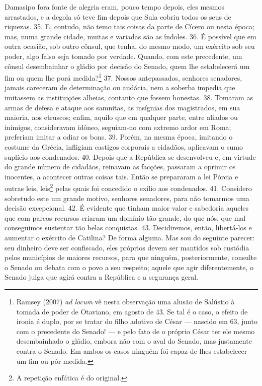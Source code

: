 Damasipo fora fonte de alegria eram, pouco tempo depois, eles mesmos
arrastados, e a degola só teve fim depois que Sula cobriu todos os seus de
riquezas. 35. E, contudo, não temo tais coisas da parte de  Cícero ou nesta
época; mas, numa grande cidade, muitas e variadas são as índoles. 36. É
possível que em outra ocasião, sob outro cônsul, que tenha, do mesmo modo, um
exército sob seu poder, algo falso seja tomado por verdade. Quando, com
este precedente, um cônsul desembainhar o gládio por decisão do Senado, quem
lhe estabelecerá um fim ou quem lhe porá medida?\footnote{Ramsey (2007)
\emph{ad locum} vê nesta observação uma alusão de Salústio à tomada de poder de
Otaviano, em agosto de 43. Se tal é o caso, o efeito de ironia é duplo, por se
tratar do filho adotivo de César --- nascido em 63, junto com o precedente do
Senado! --- e pelo fato de o próprio César ter ele mesmo desembainhado o
gládio, embora não com o aval do Senado, mas justamente contra o Senado. Em
ambos os casos ninguém foi capaz de lhes estabelecer um fim ou pôr medida.} 37.
Nossos antepassados, senhores senadores, jamais careceram de determinação ou
audácia, nem a soberba impedia que imitassem as instituições alheias, contanto
que fossem honestas. 38. Tomaram as armas de defesa e ataque aos samnitas, as
insígnias dos magistrados, em sua maioria, aos etruscos; enfim, aquilo que em
qualquer parte, entre aliados ou inimigos, consideravam idôneo, seguiam-no com
extremo ardor em Roma; preferiam imitar a odiar os bons. 39. Porém, na mesma
época, imitando o costume da Grécia, infligiam castigos corporais a cidadãos,
aplicavam o sumo suplício aos condenados. 40. Depois que a República se
desenvolveu e, em virtude do grande número de cidadãos, reinavam as facções,
passaram a oprimir os inocentes, a acontecer outras coisas tais. Então se
prepararam a lei Pórcia e outras leis, leis\footnote{A repetição enfática é do original.}
pelas quais foi concedido o exílio aos condenados. 41. Considero sobretudo este
um grande motivo, senhores senadores, para não tomarmos uma decisão
excepcional. 42. É evidente que tinham maior valor e sabedoria aqueles que com
parcos recursos criaram um domínio tão grande, do que nós, que mal conseguimos
sustentar tão belas conquistas. 43. Decidiremos, então, libertá-los e aumentar
o exército de Catilina? De forma alguma. Mas sou do seguinte parecer: seu
dinheiro deve ser confiscado, eles próprios devem ser mantidos sob custódia
pelos municípios de maiores recursos, para que ninguém, posteriormente,
consulte o Senado ou debata com o povo a seu respeito; aquele que agir
diferentemente, o Senado julga que agirá contra a República e a segurança
geral.

